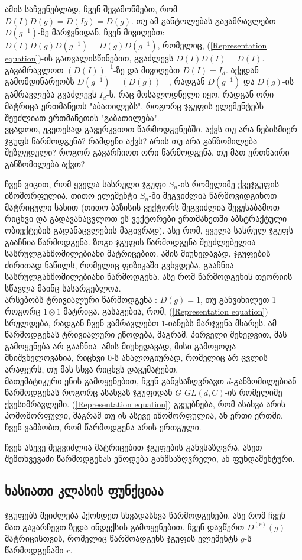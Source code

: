 \documentclass[12pt]{article}
\begin{document}
\begin{sloppypar}
ამის საჩვენებლად, ჩვენ შევამოწმებთ, რომ 
$D(I)D(g) = D(Ig) = D(g)$. თუ ამ განტოლებას გავამრავლებთ $D(g^{-1})$-ზე მარჯვნიდან, ჩვენ მივიღებთ: $D(I)D(g)D(g^{-1}) = D(g)D(g^{-1})$, რომელიც, (\ref{Representation equation})-ის გათვალისწინებით, გვაძლევს $D(I)D(I) = D(I)$. გავამრავლოთ $(D(I))^{-1}$-ზე და მივიღებთ $D(I) = I_d$.
აქედან გამომდინარეობს $D(g^{-1}) = (D(g))^{-1}$, რადგან $D(g^{-1})$ და $D(g)$-ის გამრავლება გვაძლევს $I_d$-ს, რაც მოსალოდნელი იყო, რადგან ორი მატრიცა ერთმანეთს "აბათილებს", როგორც ჯგუფის ელემენტებს შეუძლიათ ერთმანეთის "გაბათილება".\\

ვცადოთ, უკეთესად გავერკვიოთ წარმოდგენებში. აქვს თუ არა ნებისმიერ ჯგუფს წარმოდგენა? რამდენი აქვს? არის თუ არა განზომილება შეზღუდული? როგორ გავარჩიოთ ორი წარმოდგენა, თუ მათ ერთნაირი განზომილება აქვთ?

ჩვენ ვიცით, რომ ყველა სასრული ჯგუფი $S_n$-ის რომელიმე ქვეჯგუფის იზომორფულია, თითო ელემენტი $S_n$-ში შეგვიძლია წარმოვიდგინოთ მატრიცული სახით (თითო ბაზისის ვექტორს შეგვიძლია შევუსაბამოთ რიცხვი და გადავანაცვლოთ ეს ვექტორები ერთმანეთში აბსტრაქტული ობიექტების გადანაცვლების მაგივრად). ასე რომ, ყველა სასრულ ჯგუფს გააჩნია წარმოდგენა. ზოგი ჯგუფის წარმოდგენა შეუძლებელია სასრულგანზომილებიანი მატრიცებით. ამის მიუხედავად, ჯგუფების ძირითად ნაწილს, რომელიც ფიზიკაში გვხვდება, გააჩნია სასრულგანზომილებიანი წარმოდგენა. ასე რომ წარმოდგენის თეორიის სწავლა მაინც სასარგებლოა.\\
 
არსებობს ტრივიალური წარმოდგენა : $D(g) = 1$, თუ განვიხილეთ 1 როგორც $1 \otimes 1$ მატრიცა. გასაგებია, რომ, (\ref{Representation equation}) სრულდება, რადგან ჩვენ ვამრავლებთ 1-იანებს მარჯვენა მხარეს. ამ წარმოდგენას ტრივიალური ეწოდება, მაგრამ, პირველი შეხედვით, მას გამოყენება არ გააჩნია. ამის მიუხედავად, მისი გამოყოფა მნიშვნელოვანია, რიცხვი 0-ს ანალოგიურად, რომელიც არ ცვლის არაფერს, თუ მას სხვა რიცხვს დავუმატებთ.\\

მათემატიკური ენის გამოყენებით, ჩვენ განვსაზღვრავთ $d$-განზომილებიან წარმოდგენას როგორც ასახვას ჯგუფიდან $G$ $GL(d, C)$-ის რომელიმე ქვესიმრავლეში. (\ref{Representation equation}) გვეუბნება, რომ ასახვა არის ჰომომორფული, მაგრამ თუ ის ასევე იზომორფულია, ან ერთი ერთში, ჩვენ ვამბობთ, რომ წარმოდგენა არის ერთგული.

ჩვენ ასევე შეგვიძლია მატრიცებით ჯგუფების განვსაზღვრა. ასეთ შემთხვევაში წარმოდგენას ეწოდება განმსაზღვრელი, ან ფუნდამენტური.


\subsection{ხასიათი კლასის ფუნქციაა}
ჯგუფებს შეიძლება ჰქონდეთ სხვადასხვა წარმოდგენები, ასე რომ ჩვენ მათ გავარჩევთ ზედა ინდექსის გამოყენებით. ჩვენ დავწერთ $D^{(r)}(g)$ მატრიცისთვის, რომელიც წარმოადგენს ჯგუფის ელემენტს $g$-ს წარმოდგენაში $r$.
	

\end{sloppypar}
\end{document}
